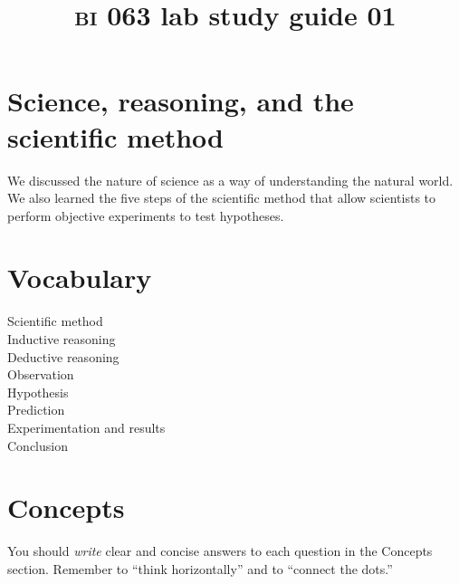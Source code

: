 \documentclass[letterpaper]{tufte-handout}
\title{{\scshape bi} 063 lab study guide 01}
\date{} %
\begin{document}
\maketitle	%

\section*{Science, reasoning, and the scientific method}

We discussed the nature of science as a way of understanding the natural world. We also learned the five steps of the scientific method that allow scientists to perform objective experiments to test hypotheses.

\section*{Vocabulary}

\vspace{-1\baselineskip}
\begin{multicols}{2}
Scientific method \\
Inductive reasoning \\
Deductive reasoning \\
Observation \\
Hypothesis \\
Prediction \\
Experimentation and results \\
Conclusion
\end{multicols}

\section{Concepts}

You should \emph{write} clear and concise answers to each question in the Concepts section.  Remember to ``think horizontally'' and to ``connect the dots.'' 
\end{document}
